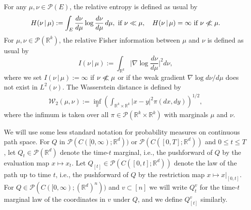 \documentclass[11pt,reqno]{amsart}
\newcommand{\nll}{\centernot{\ll}}
\numberwithin{equation}{section}
\theoremstyle{definition}
\def\P{{\mathcal P}}
\def\R{{\mathbb R}}
\def\W{{\mathcal W}}
\begin{document}
For any $\mu,\nu\in \P(E)$, the relative entropy is defined as usual by
\[
H(\nu \, |\, \mu) := \int_E \frac{d \nu}{d \mu } \log \frac{d \nu}{d \mu } \, d \mu, \text{ if } \nu \ll \mu, \quad H(\nu \, |\, \mu) =\infty \ \text{if } \nu \nll \mu.
\]
For $\mu,\nu \in \P(\R^k)$, the relative Fisher information between $ \mu $ and $ \nu $ is defined as usual by
\[I(\nu \, |\, \mu) := \int_{\R^k} \Big| \nabla \log \frac{d\nu}{d \mu} \Big|^2 d \nu,
\]
where we set $ I(\nu \, |\, \mu) := \infty $ if $ \nu \nll \mu $ or if the weak gradient $ \nabla \log d \nu /d \mu $ does not exist in $ L^2(\nu) $. The Wasserstein distance is defined by
\begin{align*}
	\W_2(\mu, \nu) := \inf_\pi \left(\int_{\R^k \times \R^k} |x - y|^2 \pi (dx, dy)\right) ^{1/2},
\end{align*}
where the infimum is taken over all $\pi \in \P(\R^k \times \R^k)$ with marginals $\mu$ and $\nu$. 




We will use some less standard notation for probability measures on continuous path space.
For $Q$ in $\P(C([0,\infty);\R^d))$ or $\P(C([0,T];\R^d))$ and $0 \le t \le T$, let $Q_t \in \P(\R^d)$ denote the time-$t$ marginal, i.e., the pushforward of $Q$ by the evaluation map $x \mapsto x_t$.
Let $Q_{[t]} \in \P(C([0,t];\R^d))$ denote the law of the path up to time $t$, i.e., the pushforward of $Q$ by the restriction map $x\mapsto x|_{[0,t]}$.
For $Q \in \P( C([0,\infty);(\R^d)^n) )$ and $v \subset [n]$ we will write $Q^v_t$ for the time-$t$ marginal law of the coordinates in $v$ under $Q$, and we define $Q^v_{[t]}$ similarly. 
\end{document}
